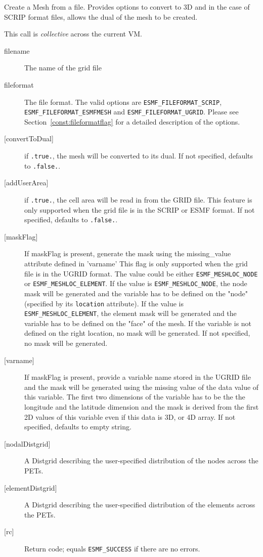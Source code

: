      Create a Mesh from a file. Provides options to convert to 3D and in the case of SCRIP
     format files, allows the dual of the mesh to be created.
  
     This call is {\em collective} across the current VM.
  
     \begin{description}
     \item [filename]
           The name of the grid file
     \item[fileformat]
           The file format. The valid options are {\tt ESMF\_FILEFORMAT\_SCRIP}, {\tt ESMF\_FILEFORMAT\_ESMFMESH} and
           {\tt ESMF\_FILEFORMAT\_UGRID}.
           Please see Section~\ref{const:fileformatflag} for a detailed description of the options.
     \item[{[convertToDual]}]
           if {\tt .true.}, the mesh will be converted to its dual. If not specified,
           defaults to {\tt .false.}.
     \item[{[addUserArea]}]
           if {\tt .true.}, the cell area will be read in from the GRID file.  This feature is
           only supported when the grid file is in the SCRIP or ESMF format. If not specified,
           defaults to {\tt .false.}.
     \item[{[maskFlag]}]
           If maskFlag is present, generate the mask using the missing\_value attribute defined in 'varname'
           This flag is only supported when the grid file is in the UGRID format.
           The value could be either {\tt ESMF\_MESHLOC\_NODE} or {\tt ESMF\_MESHLOC\_ELEMENT}.  If the value is
           {\tt ESMF\_MESHLOC\_NODE}, the node mask will be generated and the variable has to be
           defined on the "node" (specified by its {\tt location} attribute).  If the value is
           {\tt ESMF\_MESHLOC\_ELEMENT}, the element mask will be generated and the variable has to be
           defined on the "face" of the mesh.  If the variable is not defined on the right location,
           no mask will be generated.  If not specified, no mask will be generated.
     \item[{[varname]}]
           If maskFlag is present, provide a variable name stored in the UGRID file and
           the mask will be generated using the missing value of the data value of
           this variable.  The first two dimensions of the variable has to be the
           the longitude and the latitude dimension and the mask is derived from the
           first 2D values of this variable even if this data is 3D, or 4D array. If not
           specified, defaults to empty string.
     \item [{[nodalDistgrid]}]
           A Distgrid describing the user-specified distribution of
           the nodes across the PETs.
     \item [{[elementDistgrid]}]
           A Distgrid describing the user-specified distribution of
           the elements across the PETs.
     \item [{[rc]}]
           Return code; equals {\tt ESMF\_SUCCESS} if there are no errors.
     \end{description}
   
